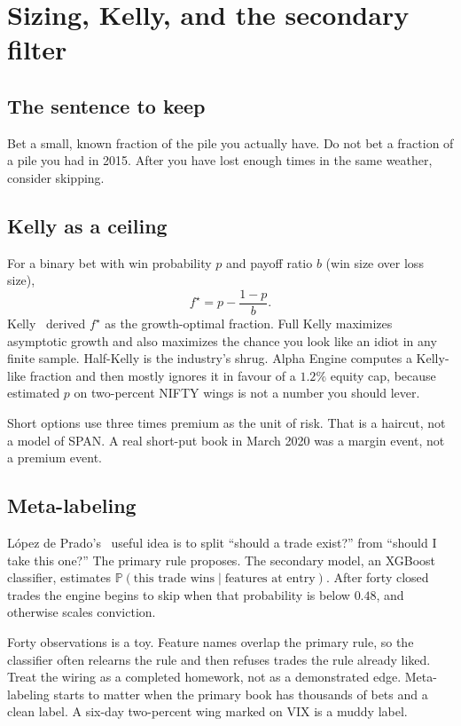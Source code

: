 \documentclass[11pt,a4paper]{article}
\begin{document}
\section{Sizing, Kelly, and the secondary filter}
\label{ch:size}

\subsection{The sentence to keep}

Bet a small, known fraction of the pile you actually have. Do not bet a fraction of a pile you had in 2015. After you have lost enough times in the same weather, consider skipping.

\subsection{Kelly as a ceiling}

For a binary bet with win probability $p$ and payoff ratio $b$ (win size over loss size),
\begin{equation}
  f^{\star}=p-\frac{1-p}{b}.
\end{equation}
Kelly~\cite{kelly1956} derived $f^{\star}$ as the growth-optimal fraction. Full Kelly maximizes asymptotic growth and also maximizes the chance you look like an idiot in any finite sample. Half-Kelly is the industry's shrug. Alpha Engine computes a Kelly-like fraction and then mostly ignores it in favour of a $1.2\%$ equity cap, because estimated $p$ on two-percent NIFTY wings is not a number you should lever.

Short options use three times premium as the unit of risk. That is a haircut, not a model of SPAN. A real short-put book in March 2020 was a margin event, not a premium event.

\subsection{Meta-labeling}

L\'opez de Prado's~\cite{lopez2018} useful idea is to split ``should a trade exist?'' from ``should I take this one?'' The primary rule proposes. The secondary model, an XGBoost classifier, estimates $\mathbb{P}(\text{this trade wins}\mid\text{features at entry})$. After forty closed trades the engine begins to skip when that probability is below $0.48$, and otherwise scales conviction.

Forty observations is a toy. Feature names overlap the primary rule, so the classifier often relearns the rule and then refuses trades the rule already liked. Treat the wiring as a completed homework, not as a demonstrated edge. Meta-labeling starts to matter when the primary book has thousands of bets and a clean label. A six-day two-percent wing marked on VIX is a muddy label.
\end{document}
